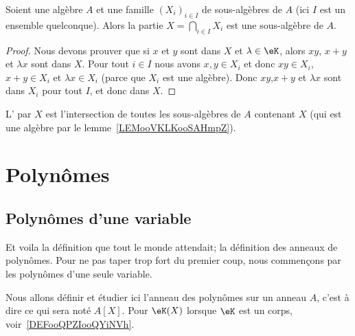 \begin{lemma}   \label{LEMooVKLKooSAHmpZ}
    Soient une algèbre \( A\) et une famille \( (X_i)_{i\in I}\) de sous-algèbres de \( A\) (ici \( I\) est un ensemble quelconque). Alors la partie \( X=\bigcap_{i\in I}X_i\) est une sous-algèbre de \( A\).
\end{lemma}

\begin{proof}
    Nous devons prouver que si \( x\) et \( y\) sont dans \( X\) et \( \lambda\in \eK\), alors \( xy\), \( x+y\) et \( \lambda x\) sont dans \( X\). Pour tout \( i\in I\) nous avons \( x,y\in X_i\) et donc \( xy\in X_i\), \( x+y\in X_i\) et \( \lambda x\in X_i\) (parce que \( X_i\) est une algèbre). Donc \( xy\),\( x+y\) et \( \lambda x\) sont dans \( X_i\) pour tout \( I\), et donc dans \( X\).
\end{proof}

\begin{definition}\label{DefkAXaWY}
    L' par \( X\) est l'intersection de toutes les sous-algèbres de \( A\) contenant \( X\) (qui est une algèbre par le lemme~\ref{LEMooVKLKooSAHmpZ}).
\end{definition}

\section{Polynômes}

\subsection{Polynômes d'une variable}

Et voila la définition que tout le monde attendait; la définition des anneaux de polynômes. Pour ne pas taper trop fort du premier coup, nous commençons par les polynômes d'une seule variable.

Nous allons définir et étudier ici l'anneau des polynômes sur un anneau \( A\), c'est à dire ce qui sera noté \( A[X]\). Pour \( \eK(X)\) lorsque \( \eK\) est un corps, voir~\ref{DEFooQPZIooQYiNVh}.

